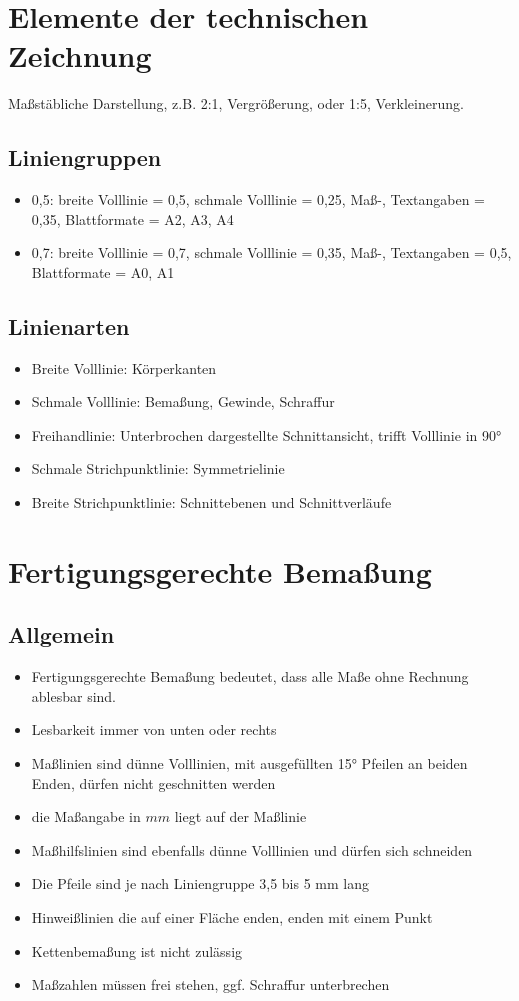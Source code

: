 \documentclass[a4paper,parskip=half*,DIV=7,fontsize=11pt]{scrartcl}
\begin{document}
\section{Elemente der technischen Zeichnung}
Maßstäbliche Darstellung, z.B. 2:1, Vergrößerung, oder 1:5, Verkleinerung.
	
\subsection{Liniengruppen}
\begin{itemize}
	\item 0,5: breite Volllinie = 0,5, schmale Volllinie = 0,25, Maß-, Textangaben = 0,35, Blattformate = A2, A3, A4
	\item 0,7: breite Volllinie = 0,7, schmale Volllinie = 0,35, Maß-, Textangaben = 0,5, Blattformate = A0, A1
\end{itemize}
	
\subsection{Linienarten}
\begin{itemize}
	\item Breite Volllinie: Körperkanten
	\item Schmale Volllinie: Bemaßung, Gewinde, Schraffur
	\item Freihandlinie: Unterbrochen dargestellte Schnittansicht, trifft Volllinie in 90°
	\item Schmale Strichpunktlinie: Symmetrielinie
	\item Breite Strichpunktlinie: Schnittebenen und Schnittverläufe
\end{itemize}
	
\section{Fertigungsgerechte Bemaßung}
\subsection{Allgemein}
\begin{itemize}
	\item Fertigungsgerechte Bemaßung bedeutet, dass alle Maße ohne Rechnung ablesbar sind.
	\item Lesbarkeit immer von unten oder rechts
	\item Maßlinien sind dünne Volllinien, mit ausgefüllten 15° Pfeilen an beiden Enden, dürfen nicht geschnitten werden
	\item die Maßangabe in $mm$ liegt auf der Maßlinie
	\item Maßhilfslinien sind ebenfalls dünne Volllinien und dürfen sich schneiden
	\item Die Pfeile sind je nach Liniengruppe 3,5 bis 5 mm lang
	\item Hinweißlinien die auf einer Fläche enden, enden mit einem Punkt
	\item Kettenbemaßung ist nicht zulässig
	\item Maßzahlen müssen frei stehen, ggf. Schraffur unterbrechen
\end{itemize}
	
\end{document}
